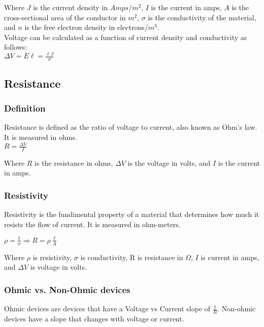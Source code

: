 Where $J$ is the current density in $Amps/m^2$, $I$ is the current in amps, $A$ is the cross-sectional 
area of the conductor in $m^2$, $\sigma$ is the conductivity of the material, and $n$ is the free electron 
density in electrons/$m^3$.\\

Voltage can be calculated as a function of current density and conductivity as follows:\\
\vbox{
    \center
    $\Delta V = E\ell = \frac{\ell J}{\sigma}$
}
\vspace{12pt}
\hrulefill

\begin{center}
\subsection*{Resistance}
\end{center}

\subsubsection*{Definition}
Resistance is defined as the ratio of voltage to current, also known as Ohm's law. It is measured in ohms.\\

\vbox{
    \center
    $R = \frac{\Delta V}{I}$
}\vspace{12pt}

Where $R$ is the resistance in ohms, $\Delta V$ is the voltage in volts, and $I$ is the current in amps.\\


\subsubsection*{Resistivity}

\hspace{.5cm} Resistivity is the fundimental property of a material that determines how much it resists the flow of current. 
It is measured in ohm-meters.

\vbox {
    \center
    $\rho = \frac{1}{\sigma} \Rightarrow R = \rho \frac{\ell}{A}$
}\vspace{12pt}

Where $\rho$ is resistivity, $\sigma$ is conductivity, R is resistance in $\Omega$, $I$ is current in amps, and $\Delta V$ is voltage in volts.

\subsubsection*{Ohmic vs. Non-Ohmic devices}
\hspace{.5cm} Ohmic devices are devices that have a Voltage vs Current slope of $\frac{1}{R}$. Non-ohmic devices have a slope that changes with voltage or current.\\

